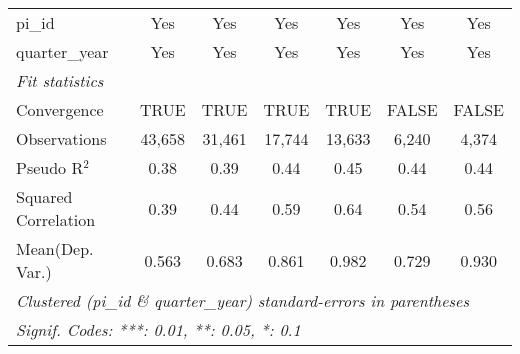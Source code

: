 \begin{tabular}{lcccccc}
   pi\_id                                                     & Yes           & Yes           & Yes           & Yes           & Yes           & Yes\\  
   quarter\_year                                              & Yes           & Yes           & Yes           & Yes           & Yes           & Yes\\  
   \midrule
   \emph{Fit statistics}\\
   Convergence                                                &TRUE           & TRUE          & TRUE          & TRUE          & FALSE         & FALSE\\  
   Observations                                               & 43,658        & 31,461        & 17,744        & 13,633        & 6,240         & 4,374\\  
   Pseudo R$^2$                                               & 0.38          & 0.39          & 0.44          & 0.45          & 0.44          & 0.44\\  
   Squared Correlation                                        & 0.39          & 0.44          & 0.59          & 0.64          & 0.54          & 0.56\\  
Mean(Dep. Var.) & 0.563 & 0.683 & 0.861 & 0.982 & 0.729 & 0.930 \\
   \midrule \midrule
   \multicolumn{7}{l}{\emph{Clustered (pi\_id \& quarter\_year) standard-errors in parentheses}}\\
   \multicolumn{7}{l}{\emph{Signif. Codes: ***: 0.01, **: 0.05, *: 0.1}}\\
\end{tabular}
\par\endgroup
